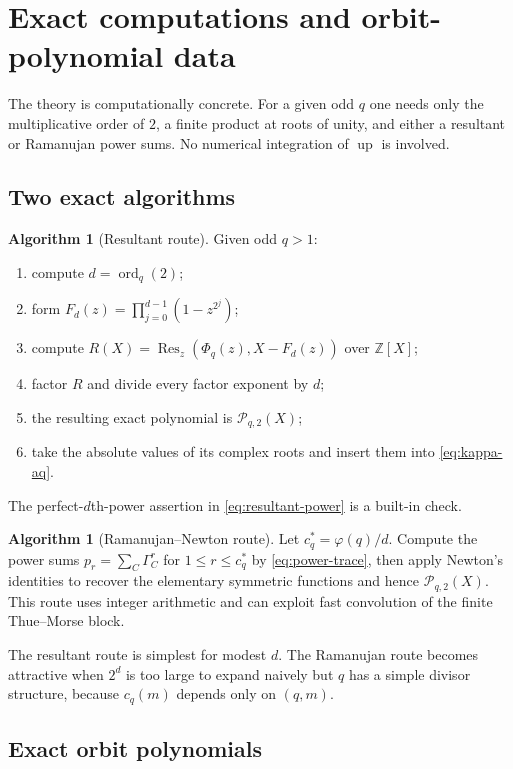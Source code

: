 \documentclass[11pt,oneside]{article}
\theoremstyle{definition}
\newtheorem{algorithm}[theorem]{Algorithm}
\theoremstyle{remark}
\newcommand{\Z}{\mathbb Z}
\newcommand{\Up}{\operatorname{up}}
\newcommand{\ord}{\operatorname{ord}}
\newcommand{\Res}{\operatorname{Res}}
\begin{document}
\section{Exact computations and orbit-polynomial data}\label{sec:computations}

The theory is computationally concrete. For a given odd $q$ one needs only the
multiplicative order of $2$, a finite product at roots of unity, and either a
resultant or Ramanujan power sums. No numerical integration of $\Up$ is involved.

\subsection{Two exact algorithms}

\begin{algorithm}[Resultant route]\label{alg:resultant}
Given odd $q>1$:
\begin{enumerate}
 \item compute $d=\ord_q(2)$;
 \item form $F_d(z)=\prod_{j=0}^{d-1}(1-z^{2^j})$;
 \item compute $R(X)=\Res_z(\Phi_q(z),X-F_d(z))$ over $\Z[X]$;
 \item factor $R$ and divide every factor exponent by $d$;
 \item the resulting exact polynomial is $\mathscr P_{q,2}(X)$;
 \item take the absolute values of its complex roots and insert them into
 \eqref{eq:kappa-aq}.
\end{enumerate}
The perfect-$d$th-power assertion in \eqref{eq:resultant-power} is a built-in check.
\end{algorithm}

\begin{algorithm}[Ramanujan--Newton route]\label{alg:ramanujan}
Let $c_q^*=\varphi(q)/d$. Compute the power sums
$p_r=\sum_C\Gamma_C^r$ for $1\le r\le c_q^*$ by \eqref{eq:power-trace}, then apply
Newton's identities to recover the elementary symmetric functions and hence
$\mathscr P_{q,2}(X)$. This route uses integer arithmetic and can exploit fast
convolution of the finite Thue--Morse block.
\end{algorithm}

The resultant route is simplest for modest $d$. The Ramanujan route becomes
attractive when $2^d$ is too large to expand naively but $q$ has a simple divisor
structure, because $c_q(m)$ depends only on $(q,m)$.

\subsection{Exact orbit polynomials}
\end{document}
